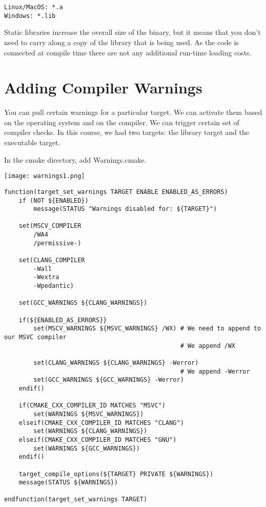 \begin{verbatim}
Linux/MacOS: *.a
Windows: *.lib
\end{verbatim}

Static libraries increase the overall size of the binary, but it means that you don't need to carry along a copy of the library that is being used.
As the code is connected at compile time there are not any additional run-time loading costs.

\section{Adding Compiler Warnings}

You can pull certain warnings for a particular target. We can activate them based on the operating system and on the compiler.
We can trigger certain set of compiler checks. In this course, we had two targets: the library target and the executable target.

In the cmake directory, add Warnings.cmake. 


\begin{center}
    \texttt{[image: warnings1.png]}
\end{center}

\begin{verbatim}
function(target_set_warnings TARGET ENABLE ENABLED_AS_ERRORS)
    if (NOT ${ENABLED})
        message(STATUS "Warnings disabled for: ${TARGET}")

    set(MSCV_COMPILER
        /WA4
        /permissive-)

    set(CLANG_COMPILER
        -Wall
        -Wextra
        -Wpedantic)

    set(GCC_WARNINGS ${CLANG_WARNINGS})

    if(${ENABLED_AS_ERRORS}}
        set(MSCV_WARNINGS ${MSVC_WARNINGS} /WX) # We need to append to our MSVC compiler
                                                # We append /WX

        set(CLANG_WARNINGS ${CLANG_WARNINGS} -Werror)
                                                # We append -Werror
        set(GCC_WARNINGS ${GCC_WARNINGS} -Werror)
    endif()

    if(CMAKE_CXX_COMPILER_ID MATCHES "MSVC")
        set(WARNINGS ${MSVC_WARNINGS})
    elseif(CMAKE_CXX_COMPILER_ID MATCHES "CLANG")
        set(WARNINGS ${CLANG_WARNINGS})
    elseif(CMAKE_CXX_COMPILER_ID MATCHES "GNU")
        set(WARNINGS ${GCC_WARNINGS})
    endif()

    target_compile_options(${TARGET} PRIVATE ${WARNINGS})
    message(STATUS ${WARNINGS})

endfunction(target_set_warnings TARGET)
\end{verbatim}

